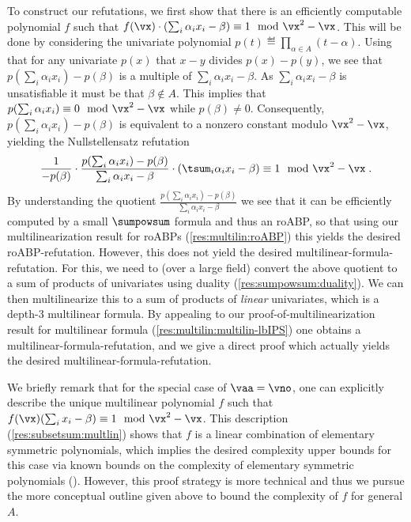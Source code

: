 \documentclass{toc}
\begin{document}
To construct our refutations, we first show that there is an efficiently computable polynomial $f$ such that $f(\vx)\cdot (\sum_i \alpha_ix_i-\beta)\equiv 1\mod\vx^2-\vx$.  This will be done by considering the univariate polynomial $p(t)\eqdef\prod_{\alpha\in A}(t-\alpha)$. Using that for any univariate $p(x)$ that $x-y$ divides $p(x)-p(y)$, we see that $p(\sum_i\alpha_ix_i)-p(\beta)$ is a multiple of $\sum_i \alpha_i x_i-\beta$.  As $\sum_i \alpha_ix_i-\beta$ is unsatisfiable it must be that $\beta\notin A$. This implies that $p(\sum_i\alpha_ix_i)\equiv 0\mod\vx^2-\vx$ while $p(\beta)\ne 0$.  Consequently, $p(\sum_i\alpha_ix_i)-p(\beta)$ is equivalent to a nonzero constant modulo $\vx^2-\vx$, yielding the Nullstellensatz refutation
\[
        \frac{1}{-p(\beta)}\cdot \frac{p(\sum_i\alpha_ix_i)-p(\beta)}{\sum_i \alpha_i x_i-\beta}\cdot (\tsum_i \alpha_i x_i-\beta)\equiv 1 \mod\vx^2-\vx
        \;.
\]
By understanding the quotient $\frac{p(\sum_i\alpha_ix_i)-p(\beta)}{\sum_i \alpha_i x_i-\beta}$ we see that it can be efficiently computed by a small $\sumpowsum$ formula and thus an roABP, so that using our multilinearization result for roABPs (\autoref{res:multilin:roABP}) this yields the desired roABP-\lIPS refutation.  However, this does not yield the desired multilinear-formula-\lIPS refutation.  For this, we need to (over a large field) convert the above quotient to a sum of products of univariates using duality (\autoref{res:sumpowsum:duality}).  We can then multilinearize this to a sum of products of \emph{linear} univariates, which is a depth-3 multilinear formula.  By appealing to our proof-of-multilinearization result for multilinear formula (\autoref{res:multilin:multilin-lbIPS}) one obtains a multilinear-formula-\lbIPS refutation, and we give a direct proof which actually yields the desired multilinear-formula-\lIPS refutation.

We briefly remark that for the special case of $\vaa=\vno$, one can explicitly describe the unique multilinear polynomial $f$ such that $f(\vx)(\sum_i x_i-\beta)\equiv 1\mod\vx^2-\vx$.  This description (\autoref{res:subsetsum:multlin}) shows that $f$ is a linear combination of elementary symmetric polynomials, which implies the desired complexity upper bounds for this case via known bounds on the complexity of elementary symmetric polynomials (\cite{NisanWigderson96}).  However, this proof strategy is more technical and thus we pursue the more conceptual outline given above to bound the complexity of $f$ for general $A$.
\end{document}
